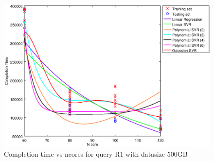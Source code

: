 
\begin {figure}[hbtp]
\centering
\includegraphics[width=\textwidth]{output/R1_500_ONLY_1_OVER_NCORES/plot_R1_500.eps}
\caption{Completion time vs ncores for query R1 with datasize 500GB}
\label{fig:all_nonlinear_R1_500}
\end {figure}
